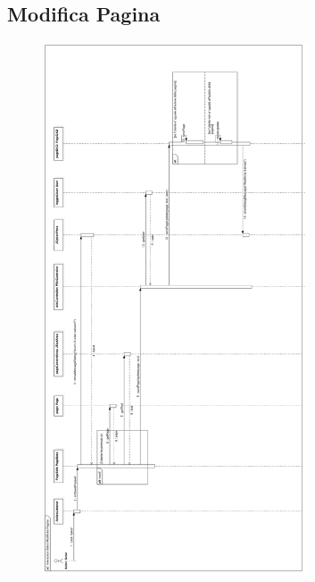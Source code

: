 \documentclass{article}
\begin{document}
	\subsection{Modifica Pagina}
	\begin{figure}[htbp]
		\centering
		\includegraphics[width=0.7\textwidth,height=0.7\textheight,keepaspectratio]{sequence_edit.png}
		\label{fig:10}
	\end{figure}
	
\end{document}
